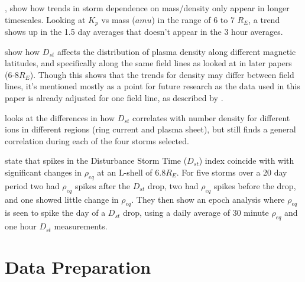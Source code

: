 \documentclass[10pt,twocolumn]{article}
\begin{document}
\cite{Takahashi2006}, show how trends in storm dependence on mass/density only appear in longer timescales. Looking at $K_p$ vs mass ($amu$) in the range of 6 to 7 $R_E$, a trend shows up in the 1.5 day averages that doesn't appear in the 3 hour averages.

\cite{Denton2006} show how $D_{st}$ affects the distribution of plasma density along different magnetic latitudes, and specifically along the same field lines as looked at in later papers (6-8$R_E$). Though this shows that the trends for density may differ between field lines, it's mentioned mostly as a point for future research as the data used in this paper is already adjusted for one field line, as described by \cite{Takahashi2010}.

\cite{Yao2008} looks at the differences in how $D_{st}$ correlates with number density for different ions in different regions (ring current and plasma sheet), but still finds a general correlation during each of the four storms selected.

\cite{Takahashi2010} state that spikes in the Disturbance Storm Time ($D_{st}$) index coincide with with significant changes in $\rho_{eq}$ at an L-shell of 6.8$R_E$. For five storms over a 20 day period two had $\rho_{eq}$ spikes after the $D_{st}$ drop, two had $\rho_{eq}$ spikes before the drop, and one showed little change in $\rho_{eq}$. They then show an epoch analysis where $\rho_{eq}$ is seen to spike the day of a $D_{st}$ drop, using a daily average of 30 minute $\rho_{eq}$ and one hour $D_{st}$ measurements. 





\section{Data Preparation}
\end{document}
